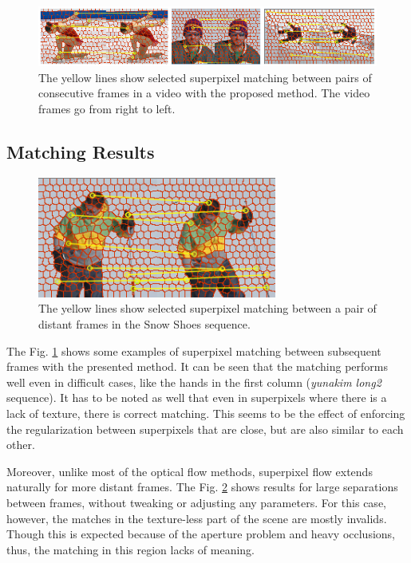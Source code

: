    \begin{figure}[thpb]
      \centering
      \includegraphics[width=1.00\textwidth]{../images/matches.png}
      \caption{The yellow lines show selected superpixel
		matching between pairs of consecutive frames in a video
		with the proposed method. The video frames go from right
		to left.}
      \label{figurelabel_matches}
   \end{figure}

\subsection{Matching Results}

   \begin{figure}[thpb]
      \centering
      \includegraphics[width=0.70\textwidth]{../images/matches_snowshoes.png}
      \caption{The yellow lines show selected superpixel
		matching between a pair of distant frames in the Snow Shoes sequence.}
      \label{figurelabel_matchessnow}
   \end{figure}   
	\setlength{\belowcaptionskip}{-10pt}
	
The Fig. \ref{figurelabel_matches} shows some examples of superpixel matching between subsequent frames with the presented method. 
It can be seen that the matching performs well even in difficult cases, like the hands in the first column ({\it yunakim long2} sequence). It has to be noted
as well that even in superpixels where there is a lack of texture, there is correct matching. This seems to be
the effect of enforcing the regularization between superpixels that are close, but are also similar to
each other.
 
Moreover, unlike most of the optical flow methods, superpixel flow extends 
 naturally for more distant frames. 
The Fig. \ref{figurelabel_matchessnow} shows
 results for large separations between frames, without tweaking or adjusting any parameters. 
For this case, however, the matches in the texture-less part of the scene
 are mostly invalids. Though this is expected because of the aperture problem and
 heavy occlusions, thus, the matching in this region lacks of meaning.
